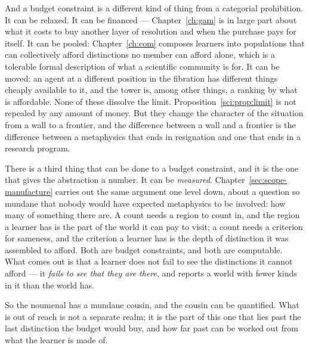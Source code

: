 And a budget constraint is a different kind of thing from a
categorial prohibition.
It can be relaxed.
It can be financed --- Chapter~\ref{ch:gam} is in large part about
what it costs to buy another layer of resolution and when the
purchase pays for itself.
It can be pooled: Chapter~\ref{ch:com} composes learners into
populations that can collectively afford distinctions no member can
afford alone, which is a tolerable formal description of what a
scientific community is for.
It can be moved: an agent at a different position in the fibration
has different things cheaply available to it, and the tower is,
among other things, a ranking by what is affordable.
None of these dissolve the limit.
Proposition~\ref{sci:prop:limit} is not repealed by any amount of
money.
But they change the character of the situation from a wall to a
frontier, and the difference between a wall and a frontier is the
difference between a metaphysics that ends in resignation and one
that ends in a research program.

There is a third thing that can be done to a budget constraint, and
it is the one that gives the abstraction a number.
It can be \emph{measured}.
Chapter~\ref{sec:scope-manufacture} carries out the same argument
one level down, about a question so mundane that nobody would have
expected metaphysics to be involved: how many of something there
are.
A count needs a region to count in, and the region a learner has is
the part of the world it can pay to visit; a count needs a criterion
for sameness, and the criterion a learner has is the depth of
distinction it was assembled to afford.
Both are budget constraints, and both are computable.
What comes out is that a learner does not fail to see the
distinctions it cannot afford --- it \emph{fails to see that they
are there}, and reports a world with fewer kinds in it than the
world has.

So the noumenal has a mundane cousin, and the cousin can be
quantified. What is out of reach is not a separate realm; it is the
part of this one that lies past the last distinction the budget
would buy, and how far past can be worked out from what the learner
is made of.


